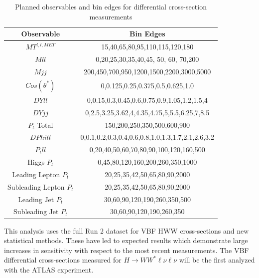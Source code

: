 \begin{table}[h!]
\begin{center}
\begin{tabular}{ |c||c|  }
 \hline
 Observable & Bin Edges\\
 \hline
 $MT^{l,l,MET}$ &15,40,65,80,95,110,115,120,180\\
 $Mll$&  0,20,25,30,35,40,45, 50, 60, 70,200\\
 $Mjj$ &200,450,700,950,1200,1500,2200,3000,5000\\
 $Cos(\theta^{*})$ &0,0.125,0.25,0.375,0.5,0.625,1.0\\
 $DYll$&   0,0.15,0.3,0.45,0.6,0.75,0.9,1.05,1.2,1.5,4\\
 $DYjj$& 0,2.5,3.25,3.62,4,4.35,4.75,5,5.5,6.25,7,8.5\\
 $P_{t}$ Total& 150,200,250,350,500,600,900\\
 $DPhill$& 0,0.1,0.2,0.3,0.4,0.6,0.8,1.0,1.3,1.7,2.1,2.6,3.2\\
 $P_{t} ll$&0,20,40,50,60,70,80,90,100,120,160,500\\
 Higgs $P_{t}$&0,45,80,120,160,200,260,350,1000\\
 Leading Lepton $P_{t}$&20,25,35,42,50,65,80,90,2000\\
 Subleading Lepton $P_{t}$&20,25,35,42,50,65,80,90,2000\\
 Leading Jet $P_{t}$&30,60,90,120,190,260,350,500\\
 Subleading Jet $P_{t}$& 30,60,90,120,190,260,350\\
 \hline
\end{tabular}
\end{center}
\caption{Planned observables and bin edges for differential cross-section measurements}
\label{tab:observablebins}
\end{table}

This analysis uses the full Run 2 dataset for VBF HWW cross-sections and new statistical methods. These have led to expected results which demonstrate large increases in sensitivity with respect to the most recent measurements. The VBF differential cross-sections measured for $H\rightarrow WW^*\ell\nu\ell\nu$ will be the first analyzed with the ATLAS experiment. 


